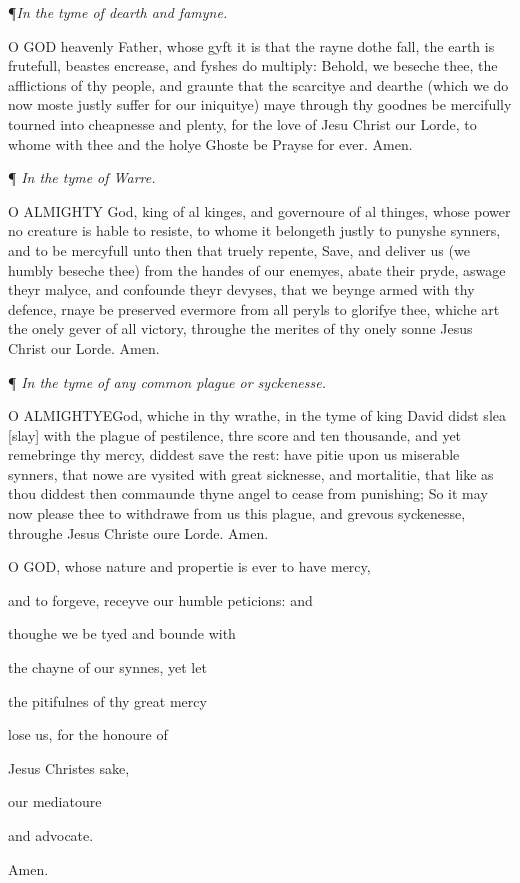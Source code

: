 ¶\emph{In the tyme of dearth and famyne.}

O GOD
heavenly Father, whose gyft it is that the rayne dothe fall, the earth
is frutefull, beastes encrease, and fyshes do multiply: Behold, we beseche
thee, the afflictions of thy people, and graunte that the scarcitye and
dearthe (which we do now moste justly suffer for our iniquitye) maye through
thy goodnes be mercifully tourned into cheapnesse and plenty, for the
love of Jesu Christ our Lorde, to whome with thee and the holye Ghoste
be Prayse for ever. Amen.

¶
\emph{In the tyme of Warre.}

O ALMIGHTY
God, king of al kinges, and governoure of al thinges, whose power no creature
is hable to resiste, to whome it belongeth justly to punyshe synners,
and to be mercyfull unto then that truely repente, Save, and deliver us
(we humbly beseche thee) from the handes of our enemyes, abate their pryde,
aswage theyr malyce, and confounde theyr devyses, that we beynge armed
with thy defence, rnaye be preserved evermore from all peryls to glorifye
thee, whiche art the onely gever of all victory, throughe the merites
of thy onely sonne Jesus Christ our Lorde. Amen.

¶
\emph{In the tyme of any common plague or syckenesse.}

O ALMIGHTYE\textbf{}God, whiche in thy wrathe, in the tyme of king David didst slea [slay]
with the plague of pestilence, thre score and ten thousande, and yet remebringe
thy mercy, diddest save the rest: have pitie upon us miserable synners,
that nowe are vysited with great sicknesse, and mortalitie, that like
as thou diddest then commaunde thyne angel to cease from punishing; So
it may now please thee to withdrawe from us this plague, and grevous syckenesse,
throughe Jesus Christe oure Lorde. Amen.

O
GOD, whose nature and propertie is ever to have mercy,

and to forgeve, receyve our humble peticions: and 

thoughe we be tyed and bounde with 

the chayne of our synnes, yet let 

the pitifulnes of thy great mercy 

lose us, for the honoure of 

Jesus Christes sake, 

our mediatoure

and advocate.

Amen.


